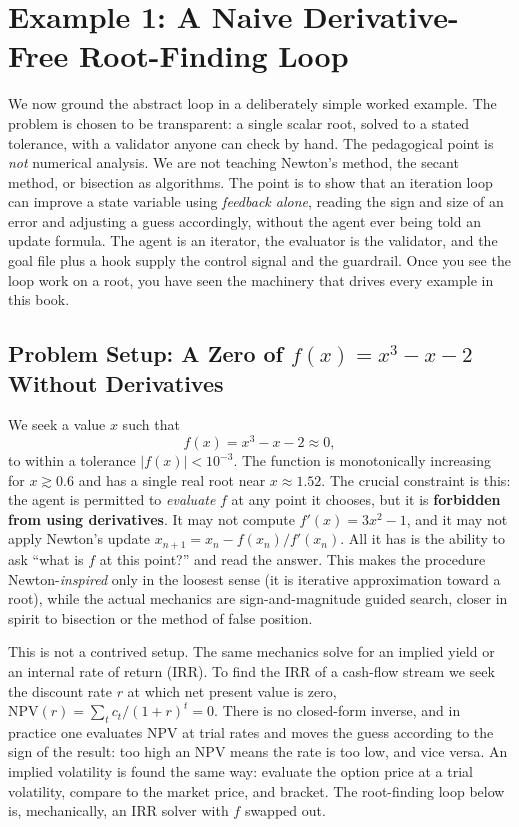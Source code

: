 \section{Example 1: A Naive Derivative-Free Root-Finding Loop}\label{sec:example-root-finding}

We now ground the abstract loop in a deliberately simple worked example. The
problem is chosen to be transparent: a single scalar root, solved to a stated
tolerance, with a validator anyone can check by hand. The pedagogical point is
\emph{not} numerical analysis. We are not teaching Newton's method, the secant
method, or bisection as algorithms. The point is to show that an iteration loop
can improve a state variable using \emph{feedback alone}, reading the sign and
size of an error and adjusting a guess accordingly, without the agent ever being
told an update formula. The agent is an iterator, the evaluator is the validator,
and the goal file plus a hook supply the control signal and the guardrail. Once
you see the loop work on a root, you have seen the machinery that drives every
example in this book.

\subsection{Problem Setup: A Zero of \texorpdfstring{$f(x)=x^3-x-2$}{f(x)=x^3-x-2} Without Derivatives}\label{subsec:rootfind-setup}

We seek a value $x$ such that
\begin{equation}\label{eq:rootfind}
  f(x) = x^3 - x - 2 \approx 0,
\end{equation}
to within a tolerance $|f(x)| < 10^{-3}$. The function is monotonically
increasing for $x \gtrsim 0.6$ and has a single real root near $x \approx 1.52$.
The crucial constraint is this: the agent is permitted to \emph{evaluate} $f$ at
any point it chooses, but it is \textbf{forbidden from using derivatives}. It may
not compute $f'(x)=3x^2-1$, and it may not apply Newton's update
$x_{n+1}=x_n-f(x_n)/f'(x_n)$. All it has is the ability to ask ``what is $f$ at
this point?'' and read the answer. This makes the procedure Newton-\emph{inspired}
only in the loosest sense (it is iterative approximation toward a root), while
the actual mechanics are sign-and-magnitude guided search, closer in spirit to
bisection or the method of false position.

\begin{remark}
This is not a contrived setup. The same mechanics solve for an implied yield or
an internal rate of return (IRR). To find the IRR of a cash-flow stream we seek
the discount rate $r$ at which net present value is zero,
$\mathrm{NPV}(r)=\sum_t c_t/(1+r)^t = 0$. There is no closed-form inverse, and in
practice one evaluates $\mathrm{NPV}$ at trial rates and moves the guess according
to the sign of the result: too high an NPV means the rate is too low, and vice
versa. An implied volatility is found the same way: evaluate the option price at
a trial volatility, compare to the market price, and bracket. The root-finding
loop below is, mechanically, an IRR solver with $f$ swapped out.
\end{remark}

